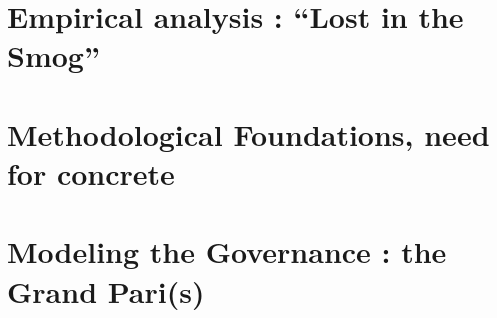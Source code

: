 






\section{Empirical analysis : ``Lost in the Smog''}








\section{Methodological Foundations, need for concrete}







\section{Modeling the Governance : the Grand Pari(s)}





